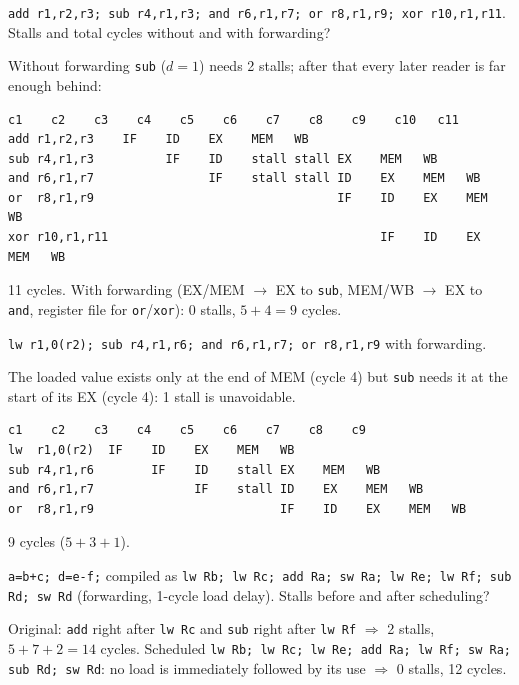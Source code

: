 \begin{exercise}
\texttt{add r1,r2,r3; sub r4,r1,r3; and r6,r1,r7; or r8,r1,r9;
xor r10,r1,r11}. Stalls and total cycles without and with forwarding?
\end{exercise}
\begin{solution}
Without forwarding \texttt{sub} ($d=1$) needs 2 stalls; after that every
later reader is far enough behind:
\begin{lstlisting}[basicstyle=\ttfamily\footnotesize,keywords={}]
                c1    c2    c3    c4    c5    c6    c7    c8    c9    c10   c11
add r1,r2,r3    IF    ID    EX    MEM   WB
sub r4,r1,r3          IF    ID    stall stall EX    MEM   WB
and r6,r1,r7                IF    stall stall ID    EX    MEM   WB
or  r8,r1,r9                                  IF    ID    EX    MEM   WB
xor r10,r1,r11                                      IF    ID    EX    MEM   WB
\end{lstlisting}
11 cycles. With forwarding (EX/MEM $\to$ EX to \texttt{sub}, MEM/WB $\to$ EX
to \texttt{and}, register file for \texttt{or}/\texttt{xor}): 0 stalls,
$5+4 = 9$ cycles.
\end{solution}

\begin{exercise}
\texttt{lw r1,0(r2); sub r4,r1,r6; and r6,r1,r7; or r8,r1,r9} with
forwarding.
\end{exercise}
\begin{solution}
The loaded value exists only at the end of MEM (cycle 4) but \texttt{sub}
needs it at the start of its EX (cycle 4): 1 stall is unavoidable.
\begin{lstlisting}[basicstyle=\ttfamily\footnotesize,keywords={}]
              c1    c2    c3    c4    c5    c6    c7    c8    c9
lw  r1,0(r2)  IF    ID    EX    MEM   WB
sub r4,r1,r6        IF    ID    stall EX    MEM   WB
and r6,r1,r7              IF    stall ID    EX    MEM   WB
or  r8,r1,r9                          IF    ID    EX    MEM   WB
\end{lstlisting}
9 cycles ($5+3+1$).
\end{solution}

\begin{exercise}
\texttt{a=b+c; d=e-f;} compiled as \texttt{lw Rb; lw Rc; add Ra; sw Ra;
lw Re; lw Rf; sub Rd; sw Rd} (forwarding, 1-cycle load delay). Stalls
before and after scheduling?
\end{exercise}
\begin{solution}
Original: \texttt{add} right after \texttt{lw Rc} and \texttt{sub} right
after \texttt{lw Rf} $\Rightarrow$ 2 stalls, $5+7+2 = 14$ cycles.
Scheduled \texttt{lw Rb; lw Rc; lw Re; add Ra; lw Rf; sw Ra; sub Rd; sw Rd}:
no load is immediately followed by its use $\Rightarrow$ 0 stalls, 12
cycles.
\end{solution}

